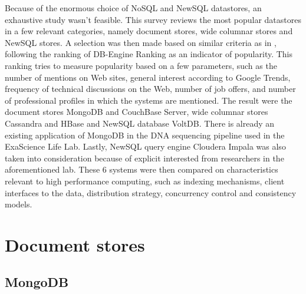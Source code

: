 \documentclass{IEEEtran}
\begin{document}
Because of the enormous choice of NoSQL and NewSQL datastores, an exhaustive study wasn't feasible. This survey reviews the most popular datastores in a few relevant categories, namely document stores, wide columnar stores and NewSQL stores. A selection was then made based on similar criteria as in \cite{grolinger2013data}, following the ranking of DB-Engine Ranking \cite{db_engine_rank} as an indicator of popularity. This ranking tries to measure popularity based on a few parameters, such as the number of mentions on Web sites, general interest according to Google Trends, frequency of technical discussions on the Web, number of job offers, and number of professional profiles in which the systems are mentioned. The result were the document stores MongoDB and CouchBase Server, wide columnar stores Cassandra and HBase and NewSQL database VoltDB. There is already an existing application of MongoDB in the DNA sequencing pipeline used in the ExaScience Life Lab\cite{elprep_mongo}. Lastly, NewSQL query engine Cloudera Impala was also taken into consideration because of explicit interested from researchers in the aforementioned lab. %
These 6 systems were then compared on characteristics relevant to high performance computing, such as indexing mechanisms, client interfaces to the data, distribution strategy, concurrency control and consistency models.

%
\section{Document stores}

\subsection{MongoDB}
\end{document}
